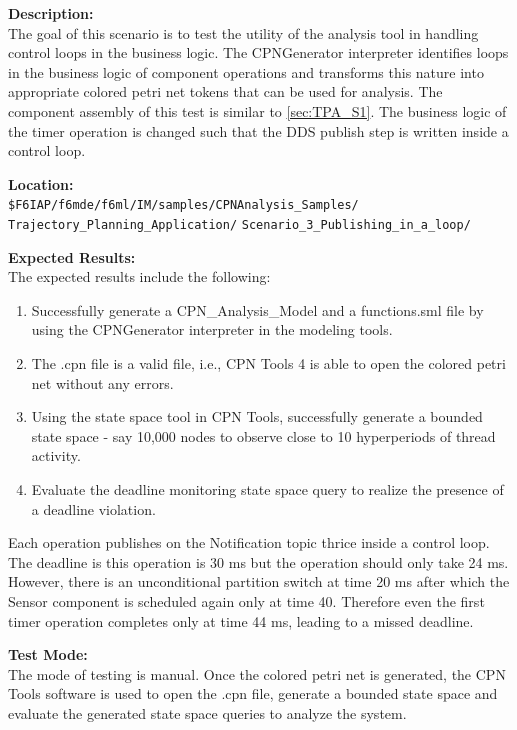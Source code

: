\noindent\textbf{Description:}\\
The goal of this scenario is to test the utility of the analysis tool in handling control loops in the business logic. The CPNGenerator interpreter identifies loops in the business logic of component operations and transforms this nature into appropriate colored petri net tokens that can be used for analysis. The component assembly of this test is similar to \ref{sec:TPA_S1}. The business logic of the timer operation is changed such that the DDS publish step is written inside a control loop. 

\noindent\textbf{Location:}\\
\texttt{\$F6IAP/f6mde/f6ml/IM/samples/CPNAnalysis\_Samples/ \\ Trajectory\_Planning\_Application/}
\texttt{Scenario\_3\_Publishing\_in\_a\_loop/}

\noindent\textbf{Expected Results:}\\

The expected results include the following: 
\begin{enumerate}
\item Successfully generate a CPN\_Analysis\_Model and a functions.sml file by using the CPNGenerator interpreter in the modeling tools.
\item The .cpn file is a valid file, i.e., CPN Tools 4 is able to open the colored petri net without any errors.
\item Using the state space tool in CPN Tools, successfully generate a bounded state space - say 10,000 nodes to observe close to 10 hyperperiods of thread activity.
\item Evaluate the deadline monitoring state space query to realize the presence of a deadline violation.
\end{enumerate}

Each operation publishes on the Notification topic thrice inside a control loop. The deadline is this operation is 30 ms but the operation should only take 24 ms. However, there is an unconditional partition switch at time 20 ms after which the Sensor component is scheduled again only at time 40. Therefore even the first timer operation completes only at time 44 ms, leading to a missed deadline. 

\noindent\textbf{Test Mode:}\\
The mode of testing is manual. Once the colored petri net is generated, the CPN Tools software is used to open the .cpn file, generate a bounded state space and evaluate the generated state space queries to analyze the system.

